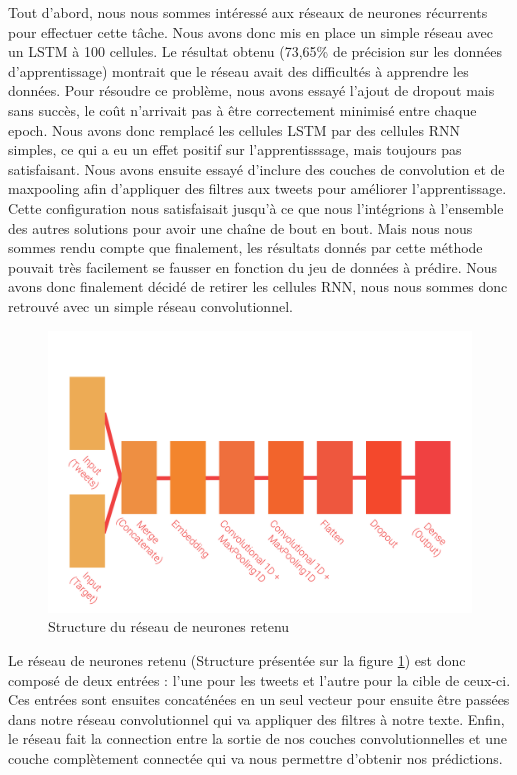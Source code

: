 \par Tout d'abord, nous nous sommes intéressé aux réseaux de neurones récurrents pour effectuer cette tâche. Nous avons donc mis en place un simple réseau avec un LSTM à 100 cellules. Le résultat obtenu (73,65\% de précision sur les données d'apprentissage) montrait que le réseau avait des difficultés à apprendre les données. Pour résoudre ce problème, nous avons essayé l'ajout de dropout mais sans succès, le coût n'arrivait pas à être correctement minimisé entre chaque epoch. Nous avons donc remplacé les cellules LSTM par des cellules RNN simples, ce qui a eu un effet positif sur l'apprentisssage, mais toujours pas satisfaisant. Nous avons ensuite essayé d'inclure des couches de convolution et de maxpooling afin d'appliquer des filtres aux tweets pour améliorer l'apprentissage. Cette configuration nous satisfaisait jusqu'à ce que nous l'intégrions à l'ensemble des autres solutions pour avoir une chaîne de bout en bout. Mais nous nous sommes rendu compte que finalement, les résultats donnés par cette méthode pouvait très facilement se fausser en fonction du jeu de données à prédire. Nous avons donc finalement décidé de retirer les cellules RNN, nous nous sommes donc retrouvé avec un simple réseau convolutionnel.

\begin{figure}
	\centering
	\includegraphics[scale=1.5]{./img/nn.png}
	\caption{Structure du réseau de neurones retenu}
	\label{fig:nn}
\end{figure}

\par Le réseau de neurones retenu (Structure présentée sur la figure \ref{fig:nn}) est donc composé de deux entrées : l'une pour les tweets et l'autre pour la cible de ceux-ci. Ces entrées sont ensuites concaténées en un seul vecteur pour ensuite être passées dans notre réseau convolutionnel qui va appliquer des filtres à notre texte. Enfin, le réseau fait la connection entre la sortie de nos couches convolutionnelles et une couche complètement connectée qui va nous permettre d'obtenir nos prédictions.


